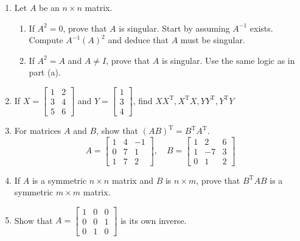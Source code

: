 \documentclass[../main.tex]{subfiles}
\begin{document}
\begin{enumerate}[label=\textbf{1.\arabic*}]
\item Let $A$ be an $n \times n$ matrix.

	\begin{enumerate}[label = \textbf{\alph*.}]
		\item If $A^{2}=0$, prove that $A$ is singular. Start by assuming $A^{-1}$ exists. Compute $A^{-1}(A)^{2}$ and deduce that $A$ must be singular.
		\item If $A^{2}=A$ and $A \neq I$, prove that $A$ is singular. Use the same logic as in part (a).
	\end{enumerate}

\item If $X=\left[\begin{array}{ll}1 & 2 \\ 3 & 4 \\ 5 & 6\end{array}\right]$ and $Y=\left[\begin{array}{c}1 \\ 3 \\ 4\end{array}\right]$, find $X X^{\mathrm{T}}, X^{\mathrm{T}} X, Y Y^{\mathrm{T}}, Y^{\mathrm{T}} Y$

\item For matrices $A$ and $B$, show that $(A B)^{\mathrm{T}}=B^{\mathrm{T}} A^{\mathrm{T}}$.
$$
A=\left[\begin{array}{ccc}
1 & 4 & -1 \\
0 & 7 & 1 \\
1 & 7 & 2
\end{array}\right], \quad
B=\left[\begin{array}{ccc}
1 & 2 & 6 \\
1 & -7 & 3 \\
0 & 1 & 2
\end{array}\right]
$$

\item If $A$ is a symmetric $n \times n$ matrix and $B$ is $n \times m$, prove that $B^{\mathrm{T}} A B$ is a symmetric $m \times m$ matrix.

\item Show that $A=\left[\begin{array}{lll}1 & 0 & 0 \\ 0 & 0 & 1 \\ 0 & 1 & 0\end{array}\right]$ is its own inverse.


\end{enumerate}
\end{document}
